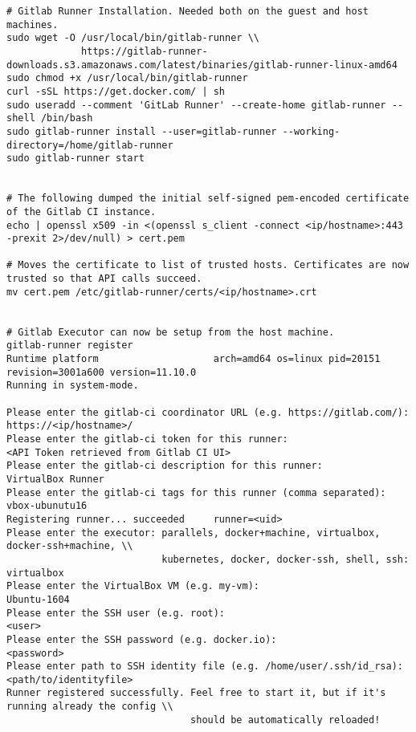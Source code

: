 \begin{lstlisting}[frame=single, basicstyle=\tiny]
# Gitlab Runner Installation. Needed both on the guest and host machines.
sudo wget -O /usr/local/bin/gitlab-runner \\
             https://gitlab-runner-downloads.s3.amazonaws.com/latest/binaries/gitlab-runner-linux-amd64
sudo chmod +x /usr/local/bin/gitlab-runner
curl -sSL https://get.docker.com/ | sh
sudo useradd --comment 'GitLab Runner' --create-home gitlab-runner --shell /bin/bash
sudo gitlab-runner install --user=gitlab-runner --working-directory=/home/gitlab-runner
sudo gitlab-runner start


# The following dumped the initial self-signed pem-encoded certificate of the Gitlab CI instance.
echo | openssl x509 -in <(openssl s_client -connect <ip/hostname>:443 -prexit 2>/dev/null) > cert.pem

# Moves the certificate to list of trusted hosts. Certificates are now trusted so that API calls succeed.
mv cert.pem /etc/gitlab-runner/certs/<ip/hostname>.crt


# Gitlab Executor can now be setup from the host machine.
gitlab-runner register
Runtime platform                    arch=amd64 os=linux pid=20151 revision=3001a600 version=11.10.0
Running in system-mode.
                            
Please enter the gitlab-ci coordinator URL (e.g. https://gitlab.com/):
https://<ip/hostname>/
Please enter the gitlab-ci token for this runner:
<API Token retrieved from Gitlab CI UI>
Please enter the gitlab-ci description for this runner:
VirtualBox Runner
Please enter the gitlab-ci tags for this runner (comma separated):
vbox-ubunutu16
Registering runner... succeeded     runner=<uid>
Please enter the executor: parallels, docker+machine, virtualbox, docker-ssh+machine, \\
                           kubernetes, docker, docker-ssh, shell, ssh:
virtualbox
Please enter the VirtualBox VM (e.g. my-vm):
Ubuntu-1604
Please enter the SSH user (e.g. root):
<user>
Please enter the SSH password (e.g. docker.io):
<password>
Please enter path to SSH identity file (e.g. /home/user/.ssh/id_rsa):
<path/to/identityfile>
Runner registered successfully. Feel free to start it, but if it's running already the config \\
                                should be automatically reloaded! 
\end{lstlisting}